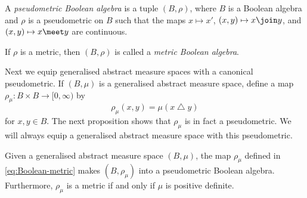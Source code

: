 \documentclass[article, a4paper, 11pt, oneside]{memoir}
\numberwithin{equation}{chapter}
\renewcommand{\symdiff}{\mathbin{\triangle}}
\begin{document}
\begin{definition}
    A \emph{pseudometric Boolean algebra} is a tuple $(B,\rho)$, where $B$ is a Boolean algebra and $\rho$ is a pseudometric on $B$ such that the maps $x \mapsto x'$, $(x,y) \mapsto x \join y$, and $(x,y) \mapsto x \meet y$ are continuous.

    If $\rho$ is a metric, then $(B,\rho)$ is called a \emph{metric Boolean algebra}.
\end{definition}

Next we equip generalised abstract measure spaces with a canonical pseudometric. If $(B,\mu)$ is a generalised abstract measure space, define a map $\rho_\mu \colon B \times B \to [0,\infty)$ by
%
\begin{equation}
    \label{eq:Boolean-metric}
    \rho_\mu(x,y)
        = \mu(x \symdiff y)
\end{equation}
%
for $x,y \in B$. The next proposition shows that $\rho_\mu$ is in fact a pseudometric. We will always equip a generalised abstract measure space with this pseudometric.

\begin{proposition}
    Given a generalised abstract measure space $(B,\mu)$, the map $\rho_\mu$ defined in \cref{eq:Boolean-metric} makes $(B,\rho_\mu)$ into a pseudometric Boolean algebra. Furthermore, $\rho_\mu$ is a metric if and only if $\mu$ is positive definite.
\end{proposition}
\end{document}
